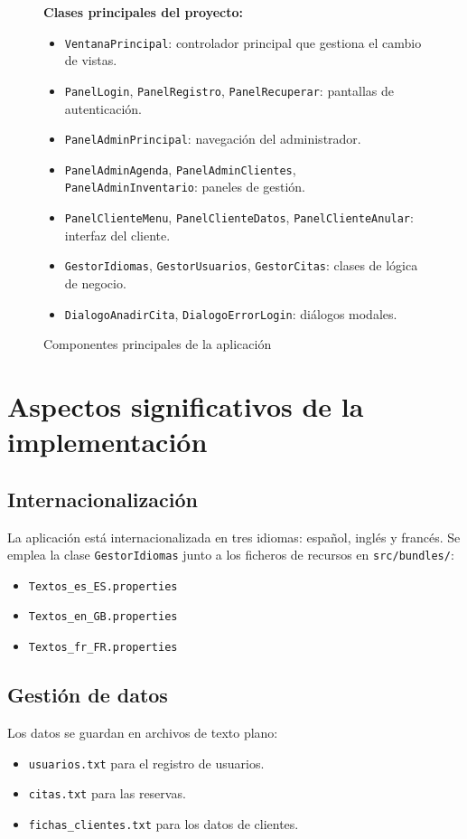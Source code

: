 \documentclass[12pt,a4paper]{report}
\begin{document}
\begin{figure}[htbp]
    \centering
    \textbf{Clases principales del proyecto:}
    \begin{itemize}
        \item \texttt{VentanaPrincipal}: controlador principal que gestiona el cambio de vistas.
        \item \texttt{PanelLogin}, \texttt{PanelRegistro}, \texttt{PanelRecuperar}: pantallas de autenticación.
        \item \texttt{PanelAdminPrincipal}: navegación del administrador.
        \item \texttt{PanelAdminAgenda}, \texttt{PanelAdminClientes}, \texttt{PanelAdminInventario}: paneles de gestión.
        \item \texttt{PanelClienteMenu}, \texttt{PanelClienteDatos}, \texttt{PanelClienteAnular}: interfaz del cliente.
        \item \texttt{GestorIdiomas}, \texttt{GestorUsuarios}, \texttt{GestorCitas}: clases de lógica de negocio.
        \item \texttt{DialogoAnadirCita}, \texttt{DialogoErrorLogin}: diálogos modales.
    \end{itemize}
    \caption{Componentes principales de la aplicación}
\end{figure}

\section{Aspectos significativos de la implementación}
\subsection{Internacionalización}
La aplicación está internacionalizada en tres idiomas: español, inglés y francés. Se emplea la clase \texttt{GestorIdiomas} junto a los ficheros de recursos en \texttt{src/bundles/}:
\begin{itemize}
    \item \texttt{Textos_es_ES.properties}
    \item \texttt{Textos_en_GB.properties}
    \item \texttt{Textos_fr_FR.properties}
\end{itemize}

\subsection{Gestión de datos}
Los datos se guardan en archivos de texto plano:
\begin{itemize}
    \item \texttt{usuarios.txt} para el registro de usuarios.
    \item \texttt{citas.txt} para las reservas.
    \item \texttt{fichas_clientes.txt} para los datos de clientes.
\end{itemize}
\end{document}
